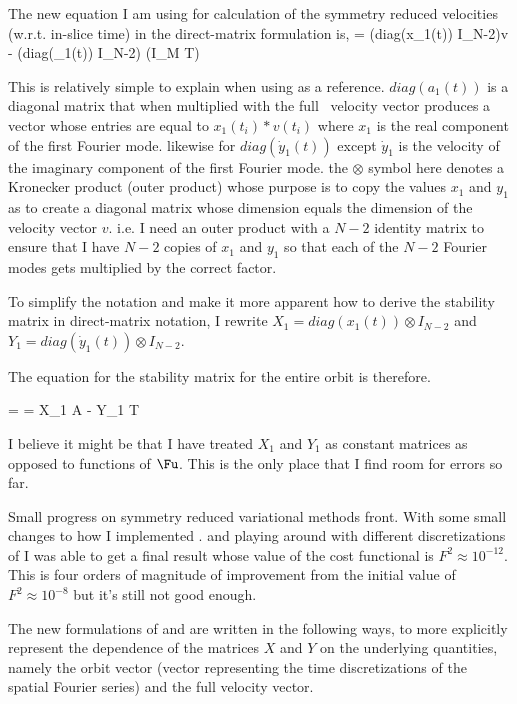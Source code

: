 The new equation I am using for calculation of the symmetry reduced velocities (w.r.t. in-slice time) in the
direct-matrix formulation is,
\beq \label{e-KSsymDMvel}
 = (diag(x_1(t)) \otimes I_{N-2})\cdot v - (diag(_1(t)) \otimes I_{N-2}) \cdot (I_M \otimes T) \cdot \Fu
\eeq

This is relatively simple to explain when using  as a reference. $diag(a_1(t))$ is a diagonal
matrix that when multiplied with the full \statesp\ velocity vector produces a vector whose entries
are equal to $x_1(t_i)*v(t_i)$ where $x_1$ is the real component of the first Fourier mode. likewise for $diag(\dot{y}_1(t))$
except $\dot{y}_1$ is the velocity of the imaginary component of the first Fourier mode. the $\otimes$ symbol here
denotes a Kronecker product (outer product) whose purpose is to copy the values $x_1$ and $y_1$ as to create a diagonal
matrix whose dimension equals the dimension of the velocity vector $v$. i.e. I need an outer product with a $N-2$ identity
matrix to ensure that I have $N-2$ copies of $x_1$ and $y_1$ so that each of the $N-2$ Fourier modes gets multiplied by
the correct factor.

To simplify the notation and make it more apparent how to derive the stability matrix in direct-matrix notation, I rewrite
$X_1 = diag(x_1(t)) \otimes I_{N-2}$ and $Y_1 = diag(\dot{y}_1(t)) \otimes I_{N-2}$.

The equation for the stability matrix for the entire orbit is therefore.

\beq \label{e-KSsymDMstb}
 =  = X_1 \cdot A - Y_1 \cdot T
\eeq

I believe it might be that I have treated $X_1$ and $Y_1$ as constant matrices as opposed to functions of $\Fu$. This
is the only place that I find room for errors so far.

Small progress on symmetry reduced variational methods front. With some small changes to how I implemented
\label{e-KSsymDM0}. and playing around
with different discretizations of  I was able to get a final result whose value
of the cost functional is $F^2 \approx 10^{-12}$. This is four orders of magnitude of improvement
from the initial value of $F^2 \approx 10^{-8}$ but it's still not good enough.

The new formulations of  and  are written in the following ways, to more
explicitly represent the dependence of the matrices $X$ and $Y$ on the underlying quantities, namely the
orbit vector (vector representing the time discretizations of the spatial Fourier series)
and the full {\statesp} velocity vector.


